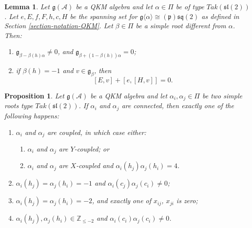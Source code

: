 \documentclass[10pt,a4paper]{amsart}
\newtheorem{lemma}{Lemma}
\newtheorem{proposition}{Proposition}
\def\g{\mathfrak{g}}
\def\l{\mathfrak{l}}
\def\p{\mathfrak{p}}
\def\s{\mathfrak{s}}
\begin{document}
	\begin{lemma}\label{lemma-sq2-rep}
		Let \(\mathfrak{g}(\mathcal{A})\) be a QKM algebra and let \(\alpha \in \Pi\) be of type $Tak(\s\l(2))$. Let \(e,E,f,F,h,c,H\) be the spanning set for $\g\langle\alpha\rangle\cong(\p)\mathfrak{sq}(2)$ as defined in Section \ref{section-notation-QKM}. Let \(\beta \in \Pi\) be a simple root different from \(\alpha\). Then:
		\begin{enumerate}
			\item $\g_{\beta-\beta(h)\alpha}\neq0$, and $\g_{\beta+(1-\beta(h))\alpha}=0$;
			\item  if \(\beta(h)=-1\) and \(v \in \mathfrak{g}_{\beta}\), then 
			\[
			[E,v] + [e,[H,v]] =0.
			\]
		\end{enumerate}
	\end{lemma}

	\begin{proposition}\label{propistion-two-sq2}
		Let \(\mathfrak{g}(\mathcal{A})\) be a QKM algebra and let \(\alpha_i, \alpha_j \in \Pi\) be two simple roots type $Tak(\s\l(2))$. If \(\alpha_i\) and \(\alpha_j\) are connected, then exactly one of the following happens:
		\begin{enumerate}[label=(\roman*)]
			\item $\alpha_i$ and $\alpha_j$ are coupled, in which case either:
			\begin{enumerate}
				\item $\alpha_i$ and $\alpha_j$ are $Y$-coupled; or
				\item $\alpha_i$ and $\alpha_j$ are $X$-coupled and $\alpha_i(h_j)\alpha_j(h_i)=4$.
			\end{enumerate}
			\item \(\alpha_i(h_j) = \alpha_j(h_i) = -1\) and \(\alpha_i(c_j)\alpha_j(c_i) \neq 0\);
			\item \(\alpha_i(h_j)=\alpha_j(h_i) = -2\),  and exactly one of \(x_{ij}\), \(x_{ji}\) is zero;
			\item \(\alpha_i(h_j),\alpha_j(h_i) \in \mathbb{Z}_{\leq -2}\) and \(\alpha_i(c_i)\alpha_j(c_i) \neq 0\).
		\end{enumerate}
	\end{proposition}
\end{document}
